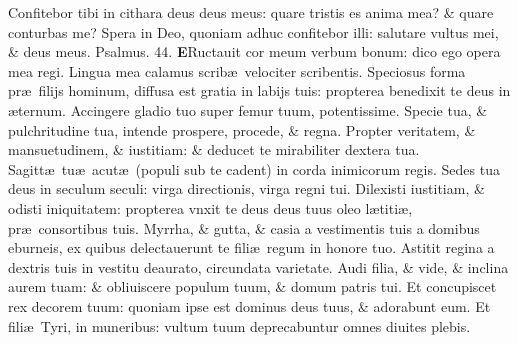 \documentclass[a5paper,10pt]{book}
\def\ae{æ}
\begin{document}
\begin{multicols*}{2}
\newline \color{red} C\color{black}onfitebor tibi in cithara deus deus meus: quare tristis es anima mea? \& quare conturbas me?
\newline \color{red} S\color{black}pera in Deo, quoniam adhuc confitebor illi: salutare vultus mei, \& deus meus.\quad \color{red} Psalmus. \hypertarget{ps44}{44.} \color{black}
\vspace{-1em}
\lettrine[lines=2]{\bfseries \color{red} E}{}Ructauit cor meum verbum bonum: dico ego opera mea regi.
\newline \color{red} L\color{black}ingua mea calamus scrib\ae \ velociter scribentis.
\newline \color{red} S\color{black}peciosus forma pr\ae \ filijs hominum, diffusa est gratia in labijs tuis: propterea benedixit te deus in \ae ternum.
\newline \color{red} A\color{black}ccingere gladio tuo super femur tuum, potentissime.
\newline \color{red} S\color{black}pecie tua, \& pulchritudine tua, intende prospere, procede, \& regna.
\newline \color{red} P\color{black}ropter veritatem, \& mansuetudinem, \& iustitiam: \& deducet te mirabiliter dextera tua.
\newline \color{red} S\color{black}agitt\ae \ tu\ae \ acut\ae \ (populi sub te cadent) in corda inimicorum regis.
\newline \color{red} S\color{black}edes tua deus in seculum seculi: virga directionis, virga regni tui.
\newline \color{red} D\color{black}ilexisti iustitiam, \& odisti iniquitatem: propterea vnxit te deus deus tuus oleo l\ae titi\ae , pr\ae \ consortibus tuis.
\newline \color{red} M\color{black}yrrha, \& gutta, \& casia a vestimentis tuis a domibus eburneis, ex quibus delectauerunt te fili\ae \ regum in honore tuo.
\newline \color{red} A\color{black}stitit regina a dextris tuis in vestitu deaurato, circundata varietate.
\newline \color{red} A\color{black}udi filia, \& vide, \& inclina aurem tuam: \& obliuiscere populum tuum, \& domum patris tui.
\newline \color{red} E\color{black}t concupiscet rex decorem tuum: quoniam ipse est dominus deus tuus, \& adorabunt eum.
\newline \color{red} E\color{black}t fili\ae \ Tyri, in muneribus: vultum tuum deprecabuntur omnes diuites plebis.

\end{multicols*}
\end{document}
